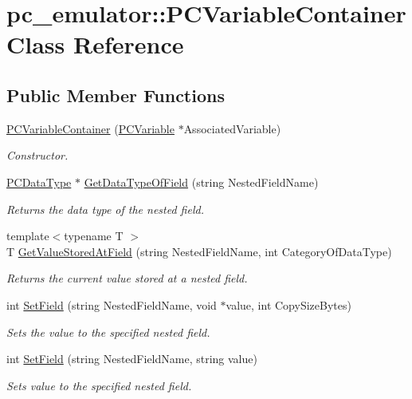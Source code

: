 \hypertarget{classpc__emulator_1_1PCVariableContainer}{}\section{pc\+\_\+emulator\+:\+:P\+C\+Variable\+Container Class Reference}
\label{classpc__emulator_1_1PCVariableContainer}
\subsection*{Public Member Functions}
\begin{DoxyCompactItemize}
\item 
\hyperlink{classpc__emulator_1_1PCVariableContainer_a9e311e87909b9eb1a296d5a9a7d99b12}{P\+C\+Variable\+Container} (\hyperlink{classpc__emulator_1_1PCVariable}{P\+C\+Variable} $\ast$Associated\+Variable)\hypertarget{classpc__emulator_1_1PCVariableContainer_a9e311e87909b9eb1a296d5a9a7d99b12}{}\label{classpc__emulator_1_1PCVariableContainer_a9e311e87909b9eb1a296d5a9a7d99b12}

\begin{DoxyCompactList}\small\item\em Constructor. \end{DoxyCompactList}\item 
\hyperlink{classpc__emulator_1_1PCDataType}{P\+C\+Data\+Type} $\ast$ \hyperlink{classpc__emulator_1_1PCVariableContainer_a727089d5202172b66a127da58b772519}{Get\+Data\+Type\+Of\+Field} (string Nested\+Field\+Name)
\begin{DoxyCompactList}\small\item\em Returns the data type of the nested field. \end{DoxyCompactList}\item 
{\footnotesize template$<$typename T $>$ }\\T \hyperlink{classpc__emulator_1_1PCVariableContainer_ae4cd77bbd392e5a3fce3c320e466a66f}{Get\+Value\+Stored\+At\+Field} (string Nested\+Field\+Name, int Category\+Of\+Data\+Type)
\begin{DoxyCompactList}\small\item\em Returns the current value stored at a nested field. \end{DoxyCompactList}\item 
int \hyperlink{classpc__emulator_1_1PCVariableContainer_a4d40aee4f0cd19a0ae7b7ea0e3ed22ed}{Set\+Field} (string Nested\+Field\+Name, void $\ast$value, int Copy\+Size\+Bytes)
\begin{DoxyCompactList}\small\item\em Sets the value to the specified nested field. \end{DoxyCompactList}\item 
int \hyperlink{classpc__emulator_1_1PCVariableContainer_a2fc5ee4f597f99a5a82576921388fd70}{Set\+Field} (string Nested\+Field\+Name, string value)
\begin{DoxyCompactList}\small\item\em Sets value to the specified nested field. \end{DoxyCompactList}\end{DoxyCompactItemize}


